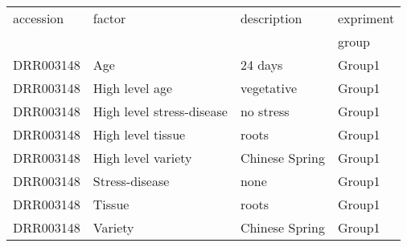 \begin{tabular}{llll}
\toprule
 accession   & factor                    & description    & expriment   \\
     &                     &     & group   \\
\midrule
 DRR003148   & Age                       & 24 days        & Group1            \\
 DRR003148   & High level age            & vegetative     & Group1            \\
 DRR003148   & High level stress-disease & no stress      & Group1            \\
 DRR003148   & High level tissue         & roots          & Group1            \\
 DRR003148   & High level variety        & Chinese Spring & Group1            \\
 DRR003148   & Stress-disease            & none           & Group1            \\
 DRR003148   & Tissue                    & roots          & Group1            \\
 DRR003148   & Variety                   & Chinese Spring & Group1            \\
\bottomrule
\end{tabular}
